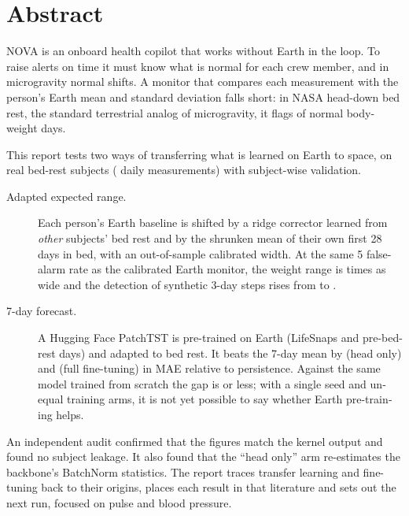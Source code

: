 \medskip{}

\chapter*{Abstract}
\begin{otherlanguage}{english}
NOVA is an onboard health copilot that works without Earth in the loop. To raise alerts on time it must know what is
normal for each crew member, and in microgravity normal shifts. A monitor that compares each measurement with the
person's Earth mean and standard deviation falls short: in NASA head-down bed rest, the standard terrestrial analog of
microgravity, it flags \pct{} of normal body-weight days.

This report tests two ways of transferring what is learned on Earth to space, on  real bed-rest
subjects ( daily measurements) with subject-wise validation.

\begin{description}
\item[Adapted expected range.] Each person's Earth baseline is shifted by a ridge corrector learned from \emph{other}
  subjects' bed rest and by the shrunken mean of their own first 28 days in bed, with an out-of-sample calibrated
  width. At the same 5\pct{} false-alarm rate as the calibrated Earth monitor, the weight range is
   times as wide and the detection of synthetic 3-day steps rises from
  \pct{} to \pct{}.
\item[7-day forecast.] A Hugging Face PatchTST is pre-trained on Earth (LifeSnaps and pre-bed-rest days) and adapted
  to bed rest. It beats the 7-day mean by  (head only) and 
  (full fine-tuning) in MAE relative to persistence. Against the same model trained from scratch the gap is
   or less; with a single seed and unequal training arms, it is not yet possible to say whether
  Earth pre-training helps.
\end{description}

An independent audit confirmed that the figures match the kernel output and found no subject leakage. It also found
that the \enquote{head only} arm re-estimates the backbone's BatchNorm statistics. The report traces transfer learning
and fine-tuning back to their origins, places each result in that literature and sets out the next run, focused on
pulse and blood pressure.
\end{otherlanguage}
